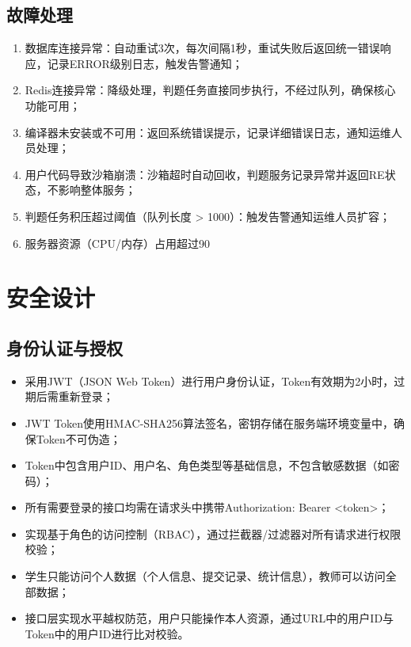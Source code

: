 \documentclass{../template/softeng}
\begin{document}
\subsection{故障处理}
\begin{enumerate}
	\item 数据库连接异常：自动重试3次，每次间隔1秒，重试失败后返回统一错误响应，记录ERROR级别日志，触发告警通知；
	\item Redis连接异常：降级处理，判题任务直接同步执行，不经过队列，确保核心功能可用；
	\item 编译器未安装或不可用：返回系统错误提示，记录详细错误日志，通知运维人员处理；
	\item 用户代码导致沙箱崩溃：沙箱超时自动回收，判题服务记录异常并返回RE状态，不影响整体服务；
	\item 判题任务积压超过阈值（队列长度 > 1000）：触发告警通知运维人员扩容；
	\item 服务器资源（CPU/内存）占用超过90%
\end{enumerate}

\section{安全设计}

\subsection{身份认证与授权}
\begin{itemize}
	\item 采用JWT（JSON Web Token）进行用户身份认证，Token有效期为2小时，过期后需重新登录；
	\item JWT Token使用HMAC-SHA256算法签名，密钥存储在服务端环境变量中，确保Token不可伪造；
	\item Token中包含用户ID、用户名、角色类型等基础信息，不包含敏感数据（如密码）；
	\item 所有需要登录的接口均需在请求头中携带Authorization: Bearer <token>；
	\item 实现基于角色的访问控制（RBAC），通过拦截器/过滤器对所有请求进行权限校验；
	\item 学生只能访问个人数据（个人信息、提交记录、统计信息），教师可以访问全部数据；
	\item 接口层实现水平越权防范，用户只能操作本人资源，通过URL中的用户ID与Token中的用户ID进行比对校验。
\end{itemize}
\end{document}
